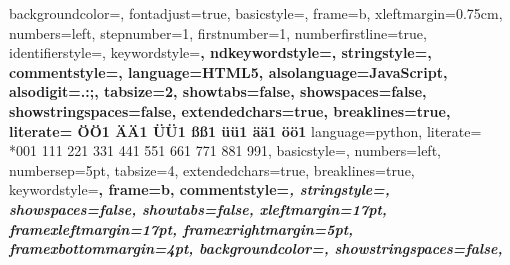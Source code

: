  {%
	backgroundcolor=\color{editorGray},
		fontadjust=true,
	basicstyle=\small\ttfamily,   
	frame=b,
	xleftmargin={0.75cm},
	numbers=left,
	stepnumber=1,
	firstnumber=1,
	numberfirstline=true,	
	identifierstyle=\color{black},
	keywordstyle=\color{blue}\bfseries,
	ndkeywordstyle=\color{editorGreen}\bfseries,
	stringstyle=\color{editorOcher}\ttfamily,
	commentstyle=\color{brown}\ttfamily,
	language=HTML5,
	alsolanguage=JavaScript,
	alsodigit={.:;},	
	tabsize=2,
	showtabs=false,
	showspaces=false,
	showstringspaces=false,
	extendedchars=true,
	breaklines=true,
	literate=%
	{Ö}{{\"O}}1
	{Ä}{{\"A}}1
	{Ü}{{\"U}}1
	{ß}{{\ss}}1
	{ü}{{\"u}}1
	{ä}{{\"a}}1
	{ö}{{\"o}}1
}
 {%
	language=python,
	literate=%
	*{0}{{{\color{lightred}0}}}1
	{1}{{{\color{lightred}1}}}1
	{2}{{{\color{lightred}2}}}1
	{3}{{{\color{lightred}3}}}1
	{4}{{{\color{lightred}4}}}1
	{5}{{{\color{lightred}5}}}1
	{6}{{{\color{lightred}6}}}1
	{7}{{{\color{lightred}7}}}1
	{8}{{{\color{lightred}8}}}1
	{9}{{{\color{lightred}9}}}1,
	basicstyle=\small\ttfamily,
	numbers=left,
	numbersep=5pt,
	tabsize=4,
	extendedchars=true,
	breaklines=true,
	keywordstyle=\color{blue}\bfseries,
	frame=b,
	commentstyle=\color{brown}\itshape,
	stringstyle=\color{editorOcher}\ttfamily,
	showspaces=false,
	showtabs=false,
	xleftmargin=17pt,
	framexleftmargin=17pt,
	framexrightmargin=5pt,
	framexbottommargin=4pt,
	backgroundcolor=\color{lightgray},
	showstringspaces=false,
}